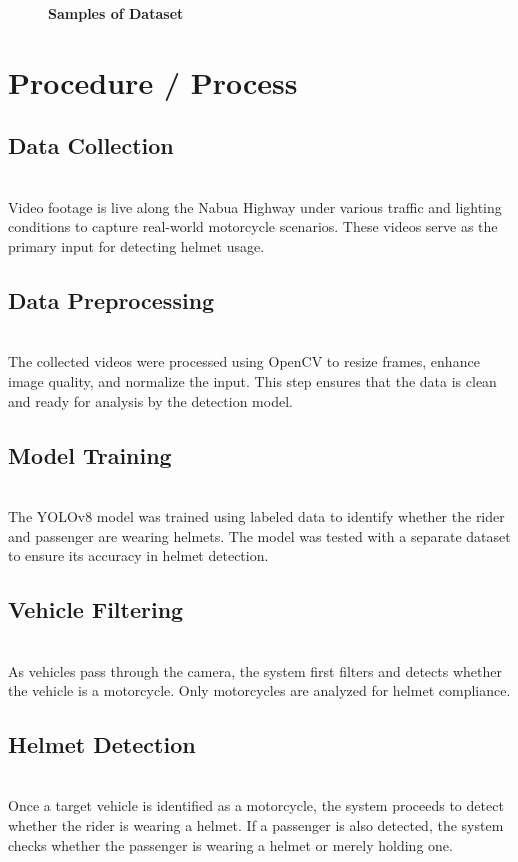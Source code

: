 \begin{refsection}
\begin{figure}[H]
    \caption{\textbf{Samples of Dataset}}
    \label{fig:dataset_samples}
\end{figure}




\section*{Procedure / Process}


    \subsection{Data Collection} \\
    Video footage is live along the Nabua Highway under various traffic and lighting conditions to capture real-world motorcycle scenarios. These videos serve as the primary input for detecting helmet usage.


    \subsection {Data Preprocessing} \\
    The collected videos were processed using OpenCV to resize frames, enhance image quality, and normalize the input. This step ensures that the data is clean and ready for analysis by the detection model.


    \subsection {Model Training} \\
    The YOLOv8 model was trained using labeled data to identify whether the rider and passenger are wearing helmets. The model was tested with a separate dataset to ensure its accuracy in helmet detection.


    \subsection {Vehicle Filtering} \\
    As vehicles pass through the camera, the system first filters and detects whether the vehicle is a motorcycle. Only motorcycles are analyzed for helmet compliance.


    \subsection {Helmet Detection} \\
    Once a target vehicle is identified as a motorcycle, the system proceeds to detect whether the rider is wearing a helmet. If a passenger is also detected, the system checks whether the passenger is wearing a helmet or merely holding one.



\end{refsection}
